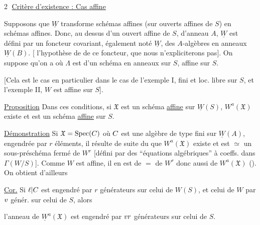 \textcircled{2} \uline{Critère d'existence : Cas affine}

Supposons que $\underline W$ transforme schémas affines (sur ouverts affines de $S$) en schémas affines. Donc, au dessus d'un ouvert affine de $S$, d'anneau $A$, $\underline W$ est défini par un foncteur covariant, également noté $\underline W$, des  $A$-algèbres  en anneaux $\underline W(B)$. [ l'hypothèse de   de ce foncteur, que nous n'expliciterons pas]. On suppose qu'on a
où $\Lambda$ est   d'un schéma en anneaux  sur $S$, affine sur $S$.

[Cela est le cas en particulier dans le cas de l'exemple I,   fini et loc. libre sur $S$, et l'exemple II,  $W$  est affine sur $S$].

\uline{Proposition} Dans ces conditions, si  $\mathfrak X$ est un schéma \uline{affine} sur $\underline W(S)$, $W^a(\mathfrak X)$ existe et est un schéma \uline{affine} sur $S$.

\uline{Démonstration}   Si $\mathfrak X=\operatorname{Spec}(C)$ où $C$ est une algèbre de type fini  sur $\underline W(A)$, engendrée par $r$ éléments, il résulte de suite du  que $W^a(\mathfrak X)$ existe et est $\simeq$ un sous-préschéma fermé de $W^r$ [défini par des ``équations algébriques'' à coeffs.  dans $\Gamma(W/S)$]. Comme $W$ est affine, il en est de $=$ de  $W^r$ donc aussi de $W^a(\mathfrak X)$ (). On obtient d'ailleurs

\uline{Cor.}   Si $\ell|C$ est engendré par $r$ générateurs sur celui de $W(S)$, et celui de $W$ par $v$ génér. sur celui de $S$, alors

l'anneau de $\underline W^a(\mathfrak X)$ est engendré par $vr$ générateurs sur celui de $S$.

